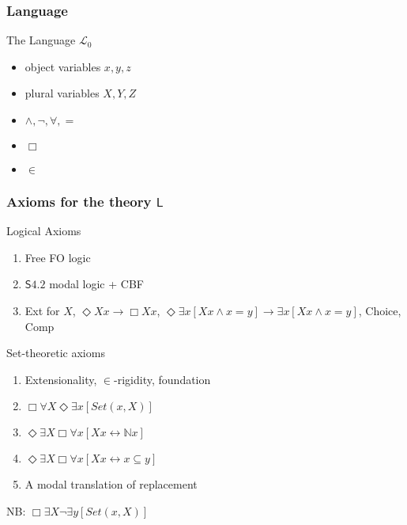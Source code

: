 \documentclass{beamer}
\begin{document}
\begin{frame}
    \frametitle{Language}
    \begin{block}{The Language $\mathcal{L}_0$}
        \begin{itemize}
            \item object variables $x, y, z$
            \item<2-> plural variables $X, Y, Z$
            \item<3-> $\wedge, \neg, \forall, =$
            \item<4-> $\Box$
            \item<5-> $\in$
        \end{itemize} 
    \end{block}
\end{frame}

\begin{frame}
    \frametitle{Axioms for the theory $\mathsf{L}$}
    \begin{block}{Logical Axioms}
    \begin{enumerate}
        \item<2-> Free FO logic
        \item<3-> $\mathsf{S4.2}$ modal logic + CBF
        \item<4-> Ext for $X$, $\Diamond Xx \rightarrow \Box Xx$, 
        $\Diamond \exists x[Xx \wedge x = y] \rightarrow \exists x[Xx \wedge x = y]$,
        Choice, Comp
    \end{enumerate}
    \end{block}
    \begin{block}{Set-theoretic axioms}
        \begin{enumerate}
        \item<6-> Extensionality, $\in$-rigidity, foundation
        \item<7-> $\Box \forall X \Diamond \exists x [Set(x, X)]$
        \item<9-> $\Diamond \exists X \Box \forall x[Xx \leftrightarrow \mathbb{N}x]$
        \item<10-> $\Diamond \exists X \Box \forall x[Xx \leftrightarrow x \subseteq y]$
        \item<11-> A modal translation of replacement
        \end{enumerate}
    \end{block}
     NB: $\Box \exists X \neg \exists y [Set(x, X)]$
\end{frame}
\end{document}
